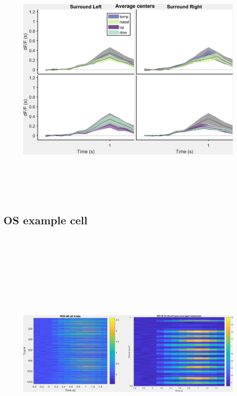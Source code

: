 \begin{figure}[H] \centering \includegraphics[width=12.5cm,height=12.5cm,keepaspectratio]{Figures/7.Results/individualSM/roi 29 mf379 pos5/averagecenters.png} 
\end{figure}

\subsection{OS example cell}

\begin{figure}[H] \centering \includegraphics[width=12.5cm,height=12.5cm,keepaspectratio]{Figures/7.Results/individualSM/roi 46 mf379 pos2/roi46.png} 
\end{figure}

